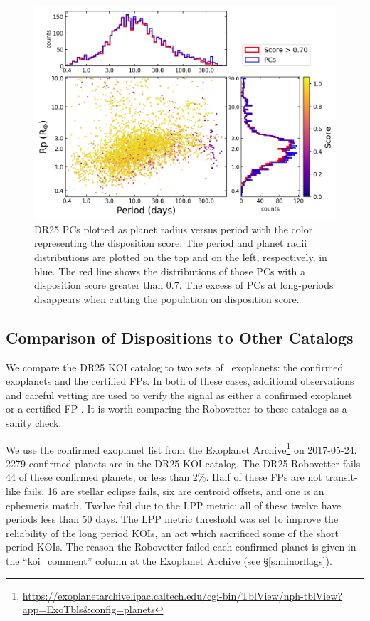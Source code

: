 \begin{figure}[htb]
    \centering
    \includegraphics[width=\linewidth]{f7.png}
    \caption{DR25 PCs plotted as planet radius versus period with the color representing the disposition score. The period and planet radii distributions are plotted on the top and on the left, respectively, in blue. The red line shows the distributions of those PCs with a disposition score greater than 0.7. The excess of PCs at long-periods disappears when cutting the population on disposition score. }
    \label{f:catalogPlot}
\end{figure}

\subsection{Comparison of Dispositions to Other Catalogs}
We compare the DR25 KOI catalog to two sets of \Kepler\ exoplanets: the confirmed exoplanets and the certified FPs.  In both of these cases, additional observations and careful vetting are used to verify the signal as either a confirmed exoplanet or a certified FP \citep{Bryson2017c}. It is worth comparing the Robovetter to these catalogs as a sanity check.  

We use the confirmed exoplanet list from the Exoplanet Archive\footnote{\url{https://exoplanetarchive.ipac.caltech.edu/cgi-bin/TblView/nph-tblView?app=ExoTbls\&config=planets}} on 2017-05-24.  2279 confirmed planets are in the DR25 KOI catalog.  The DR25 Robovetter fails 44 of these confirmed planets, or less than 2\%. Half of these FPs are not transit-like fails, 16 are stellar eclipse fails, six are centroid offsets, and one is an ephemeris match. Twelve fail due to the LPP metric; all of these twelve have periods less than 50 days.  The LPP metric threshold was set to improve the reliability of the long period KOIs, an act which sacrificed some of the short period KOIs.  The reason the Robovetter failed each confirmed planet is given in the ``koi\_comment'' column at the Exoplanet Archive (see \S\ref{s:minorflags}). 


